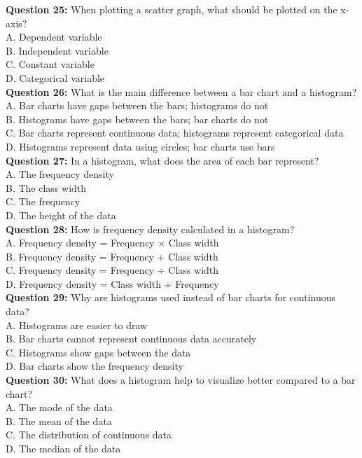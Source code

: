 \documentclass{article}
\begin{document}
\textbf{Question 25:} When plotting a scatter graph, what should be plotted on the x-axis? \\
A. Dependent variable \\
B. Independent variable \\
C. Constant variable \\
D. Categorical variable \\

\textbf{Question 26:} What is the main difference between a bar chart and a histogram? \\
A. Bar charts have gaps between the bars; histograms do not \\
B. Histograms have gaps between the bars; bar charts do not \\
C. Bar charts represent continuous data; histograms represent categorical data \\
D. Histograms represent data using circles; bar charts use bars \\

\textbf{Question 27:} In a histogram, what does the area of each bar represent? \\
A. The frequency density \\
B. The class width \\
C. The frequency \\
D. The height of the data \\

\textbf{Question 28:} How is frequency density calculated in a histogram? \\
A. Frequency density = Frequency × Class width \\
B. Frequency density = Frequency + Class width \\
C. Frequency density = Frequency ÷ Class width \\
D. Frequency density = Class width ÷ Frequency \\

\textbf{Question 29:} Why are histograms used instead of bar charts for continuous data? \\
A. Histograms are easier to draw \\
B. Bar charts cannot represent continuous data accurately \\
C. Histograms show gaps between the data \\
D. Bar charts show the frequency density \\

\textbf{Question 30:} What does a histogram help to visualize better compared to a bar chart? \\
A. The mode of the data \\
B. The mean of the data \\
C. The distribution of continuous data \\
D. The median of the data \\
\end{document}
